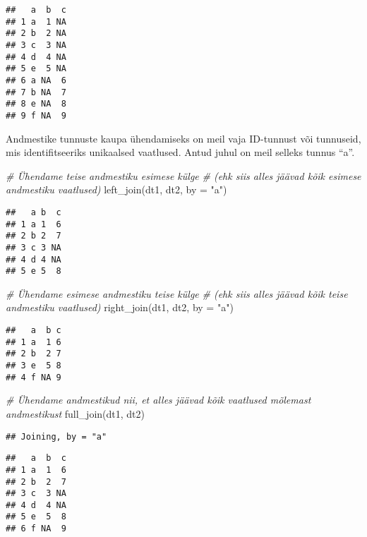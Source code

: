\documentclass[
]{book}
\newenvironment{Shaded}{\begin{snugshade}}{\end{snugshade}}
\newcommand{\AttributeTok}[1]{\textcolor[rgb]{0.77,0.63,0.00}{#1}}
\newcommand{\CommentTok}[1]{\textcolor[rgb]{0.56,0.35,0.01}{\textit{#1}}}
\newcommand{\FunctionTok}[1]{\textcolor[rgb]{0.00,0.00,0.00}{#1}}
\newcommand{\NormalTok}[1]{#1}
\newcommand{\StringTok}[1]{\textcolor[rgb]{0.31,0.60,0.02}{#1}}
\begin{document}
\begin{verbatim}
##   a  b  c
## 1 a  1 NA
## 2 b  2 NA
## 3 c  3 NA
## 4 d  4 NA
## 5 e  5 NA
## 6 a NA  6
## 7 b NA  7
## 8 e NA  8
## 9 f NA  9
\end{verbatim}

Andmestike tunnuste kaupa ühendamiseks on meil vaja ID-tunnust või tunnuseid, mis identifitseeriks unikaalsed vaatlused. Antud juhul on meil selleks tunnus ``a''.

\begin{Shaded}
\begin{Highlighting}[]
\CommentTok{\# Ühendame teise andmestiku esimese külge }
\CommentTok{\# (ehk siis alles jäävad kõik esimese andmestiku vaatlused)}
\FunctionTok{left\_join}\NormalTok{(dt1, dt2, }\AttributeTok{by =} \StringTok{"a"}\NormalTok{)}
\end{Highlighting}
\end{Shaded}

\begin{verbatim}
##   a b  c
## 1 a 1  6
## 2 b 2  7
## 3 c 3 NA
## 4 d 4 NA
## 5 e 5  8
\end{verbatim}

\begin{Shaded}
\begin{Highlighting}[]
\CommentTok{\# Ühendame esimese andmestiku teise külge }
\CommentTok{\# (ehk siis alles jäävad kõik teise andmestiku vaatlused)}
\FunctionTok{right\_join}\NormalTok{(dt1, dt2, }\AttributeTok{by =} \StringTok{"a"}\NormalTok{)}
\end{Highlighting}
\end{Shaded}

\begin{verbatim}
##   a  b c
## 1 a  1 6
## 2 b  2 7
## 3 e  5 8
## 4 f NA 9
\end{verbatim}

\begin{Shaded}
\begin{Highlighting}[]
\CommentTok{\# Ühendame andmestikud nii, et alles jäävad kõik vaatlused mõlemast andmestikust}
\FunctionTok{full\_join}\NormalTok{(dt1, dt2)}
\end{Highlighting}
\end{Shaded}

\begin{verbatim}
## Joining, by = "a"
\end{verbatim}

\begin{verbatim}
##   a  b  c
## 1 a  1  6
## 2 b  2  7
## 3 c  3 NA
## 4 d  4 NA
## 5 e  5  8
## 6 f NA  9
\end{verbatim}
\end{document}
